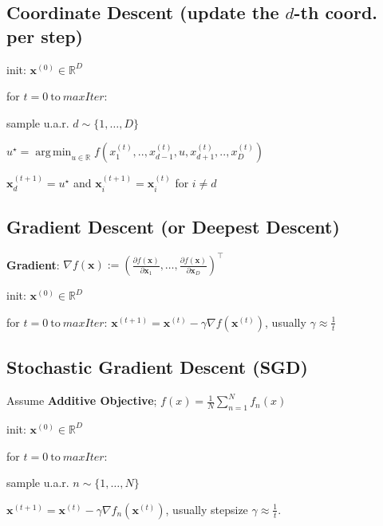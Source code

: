 \documentclass[a4paper, 11pt, landscape]{article}
\DeclareMathOperator*{\argmin}{arg\,min}
\begin{document}
\begin{multicols*}{3}
\subsection{Coordinate Descent (update the $d$-th coord. per step)}
\begin{inparaenum}
	\item init: $\mathbf{x}^{(0)} \in \mathbb{R}^D$
	\item for $t = 0 \ \text{to} \ \mathit{maxIter}$:
	\item sample u.a.r. $d \sim \{1, \ldots, D\}$
	\item $u^\star = \argmin_{u \in \mathbb{R}} f(x_1^{(t)}, .., x_{d-1}^{(t)}, u, x_{d+1}^{(t)}, .., x_D^{(t)})$
	\item $\mathbf{x}_d^{(t+1)} = u^\star$ and $\mathbf{x}_i^{(t+1)} = \mathbf{x}_i^{(t)}$ for $i \neq d$
\end{inparaenum}

\subsection{Gradient Descent (or Deepest Descent)}
\textbf{Gradient}: $\nabla f(\mathbf{x}) := \left( \frac{\partial f(\mathbf{x})}{\partial \mathbf{x}_1}, \ldots, \frac{\partial f(\mathbf{x})}{\partial \mathbf{x}_D} \right)^\top$
\begin{inparaenum}
	\item init: $\mathbf{x}^{(0)} \in \mathbb{R}^D$
	\item for $t = 0 \ \text{to} \ \mathit{maxIter}$: $\mathbf{x}^{(t+1)} = \mathbf{x}^{(t)} - \gamma \nabla f(\mathbf{x}^{(t)})$, usually $\gamma \approx \frac{1}{t}$
\end{inparaenum}

\subsection{Stochastic Gradient Descent (SGD)}
Assume \textbf{Additive Objective}; $f(x) = \frac{1}{N}\sum_{n=1}^{N}f_n(x)$
\begin{inparaenum}
	\item init: $\mathbf{x}^{(0)} \in \mathbb{R}^D$
	\item for $t = 0 \ \text{to} \ \mathit{maxIter}$:
	\item sample u.a.r. $n \sim \{1, \ldots, N\}$
	\item $\mathbf{x}^{(t+1)} = \mathbf{x}^{(t)} - \gamma \nabla f_n(\mathbf{x}^{(t)})$, usually stepsize $\gamma \approx \frac{1}{t}$. 
\end{inparaenum}


\end{multicols*}
\end{document}
